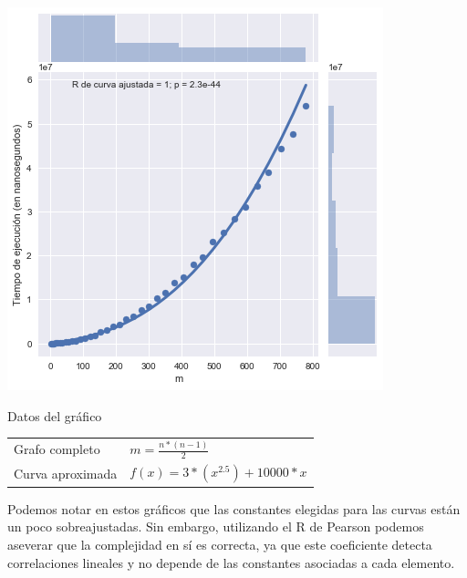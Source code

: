 \noindent
\begin{minipage}{0.55\textwidth}
    \hfill
    \includegraphics[scale=0.6]{img/local-m.png}
\end{minipage}
\hfill
\begin{minipage}{0.44\textwidth}
    \begin{center}
        Datos del gráfico

        \begin{tabular}{ | l l |}
            \hline
            Grafo completo & $m = \frac{n * (n-1)}{2}$\\ 
            Curva aproximada & $f(x) = 3 * (x^{2.5}) + 10000 * x$ \\
            \hline
        \end{tabular}
    \end{center}
\end{minipage}

Podemos notar en estos gráficos que las constantes elegidas para las curvas están un poco sobreajustadas. Sin embargo, utilizando el R de Pearson podemos aseverar que la complejidad en sí es correcta, ya que este coeficiente detecta correlaciones lineales y no depende de las constantes asociadas a cada elemento.